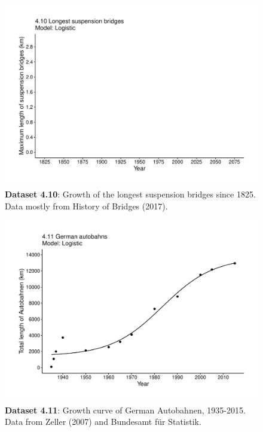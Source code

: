 \documentclass[aps,rmp,preprint,superscriptaddress,10pt,onecolumn]{article}
\begin{document}
\clearpage
\begin{figure}[h]
\includegraphics[width=\textwidth]{output/figs-ggplot/4.10.pdf}
\caption{\textbf{Dataset 4.10}: Growth of the longest suspension bridges since 1825. Data mostly from History of Bridges (2017).}
\end{figure}
	
\clearpage
\begin{figure}[h]
\includegraphics[width=\textwidth]{output/figs-ggplot/4.11.pdf}
\caption{\textbf{Dataset 4.11}: Growth curve of German Autobahnen, 1935-2015. Data from Zeller (2007) and Bundesamt für Statistik.}
\end{figure}
	
\end{document}
